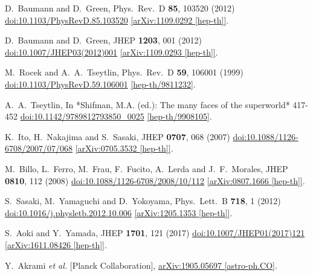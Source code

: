 \documentclass[12pt]{article}
\begin{document}
\begin{thebibliography}{99}
  D.~Baumann and D.~Green,
  Phys.\ Rev.\ D {\bf 85}, 103520 (2012)
  \href{https://dx.doi.org/10.1103/PhysRevD.85.103520}{doi:10.1103/PhysRevD.85.103520}
  \href{https://arxiv.org/abs/1109.0292}{[arXiv:1109.0292 [hep-th]]}.

  D.~Baumann and D.~Green,
  JHEP {\bf 1203}, 001 (2012)
  \href{https://dx.doi.org/10.1007/JHEP03(2012)001}{doi:10.1007/JHEP03(2012)001}
  \href{https://arxiv.org/abs/1109.0293}{[arXiv:1109.0293 [hep-th]]}.

  M.~Rocek and A.~A.~Tseytlin,
  Phys.\ Rev.\ D {\bf 59}, 106001 (1999)
  \href{https://dx.doi.org/10.1103/PhysRevD.59.106001}{doi:10.1103/PhysRevD.59.106001}
  \href{https://arxiv.org/abs/hep-th/9811232}{[hep-th/9811232]}.

  A.~A.~Tseytlin,
  In *Shifman, M.A. (ed.): The many faces of the superworld* 417-452
  \href{https://dx.doi.org/10.1142/9789812793850\_0025}{doi:10.1142/9789812793850\_0025}
  \href{https://arxiv.org/abs/hep-th/9908105}{[hep-th/9908105]}.

  K.~Ito, H.~Nakajima and S.~Sasaki,
  JHEP {\bf 0707}, 068 (2007)
  \href{https://dx.doi.org/10.1088/1126-6708/2007/07/068}{doi:10.1088/1126-6708/2007/07/068}
  \href{https://arxiv.org/abs/0705.3532}{[arXiv:0705.3532 [hep-th]]}.

  M.~Billo, L.~Ferro, M.~Frau, F.~Fucito, A.~Lerda and J.~F.~Morales,
  JHEP {\bf 0810}, 112 (2008)
  \href{https://dx.doi.org/10.1088/1126-6708/2008/10/112}{doi:10.1088/1126-6708/2008/10/112}
  \href{https://arxiv.org/abs/0807.1666}{[arXiv:0807.1666 [hep-th]]}.

  S.~Sasaki, M.~Yamaguchi and D.~Yokoyama,
  Phys.\ Lett.\ B {\bf 718}, 1 (2012)
  \href{https://dx.doi.org/10.1016/j.physletb.2012.10.006}{doi:10.1016/j.physletb.2012.10.006}
  \href{https://arxiv.org/abs/1205.1353}{[arXiv:1205.1353 [hep-th]]}.

  S.~Aoki and Y.~Yamada,
  JHEP {\bf 1701}, 121 (2017)
  \href{https://dx.doi.org/10.1007/JHEP01(2017)121}{doi:10.1007/JHEP01(2017)121}
  \href{https://arxiv.org/abs/1611.08426}{[arXiv:1611.08426 [hep-th]]}.

  Y.~Akrami {\it et al.} [Planck Collaboration],
  \href{https://arxiv.org/abs/1905.05697}{arXiv:1905.05697 [astro-ph.CO]}.

\end{thebibliography}
\end{document}
